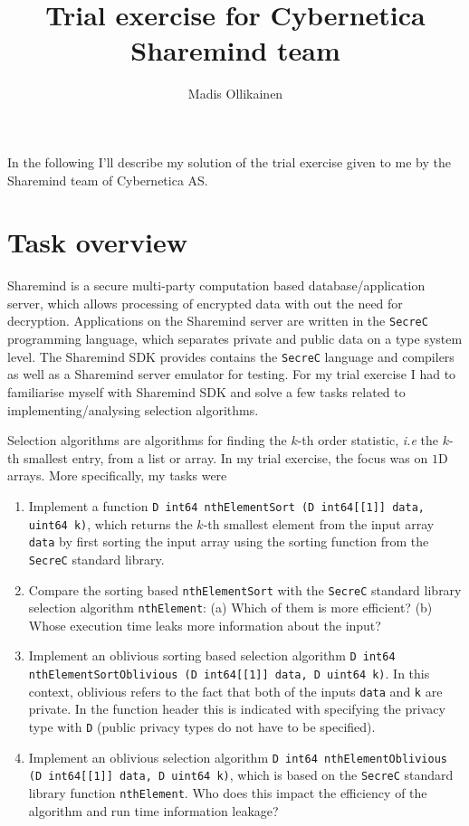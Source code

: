 \documentclass[11pt]{article}
\author{Madis Ollikainen}
\title{Trial exercise for Cybernetica Sharemind team}
\newcommand{\ct}[1]{\texttt{#1}}
\newcommand{\SC}{\ct{SecreC}\xspace}
\begin{document}
\maketitle

In the following I'll describe my solution of the trial exercise given to me by the Sharemind team of Cybernetica AS.

\section{Task overview} %
\label{sec:task_overview}

Sharemind is a secure multi-party computation based database/application server, which allows processing of encrypted data with out the need for decryption. Applications on the Sharemind server are written in the \SC programming language, which separates private and public data on a type system level. The Sharemind SDK provides contains the \SC language and compilers as well as a Sharemind server emulator for testing. For my trial exercise I had to familiarise myself with Sharemind SDK and solve a few tasks related to implementing/analysing selection algorithms.

Selection algorithms are algorithms for finding the $k$-th order statistic, \emph{i.e} the $k$-th smallest entry, from a list or array. In my trial exercise, the focus was on $1$D arrays. More specifically, my tasks were

\begin{enumerate}
      	\item Implement a function \ct{D int64 nthElementSort (D int64[[1]] data, uint64 k)}, which returns the $k$-th smallest element from the input array \ct{data} by first sorting the input array using the sorting function from the \SC standard library.

      	\item Compare the sorting based \ct{nthElementSort} with the \SC standard library selection algorithm \ct{nthElement}: (a) Which of them is more efficient? (b) Whose execution time leaks more information about the input? 

      	\item Implement an oblivious sorting based selection algorithm \ct{D int64 nthElementSortOblivious (D int64[[1]] data, D uint64 k)}. In this context, oblivious refers to the fact that both of the inputs \ct{data} and \ct{k} are private. In the function header this is indicated with specifying the privacy type with \ct{D} (public privacy types do not have to be specified). 

      	\item Implement an oblivious selection algorithm \ct{D int64 nthElementOblivious (D int64[[1]] data, D uint64 k)}, which is based on the \SC standard library function \ct{nthElement}. Who does this impact the efficiency of the algorithm and run time information leakage? 
\end{enumerate}      
\end{document}
